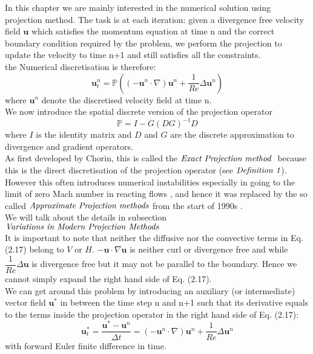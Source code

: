 In this chapter we are mainly interested in the numerical solution using projection method. The task is at each iteration: given a divergence free velocity field $\textbf{u}$ which satisfies the momentum equation at time n and the correct boundary condition required by the problem, we perform the projection to update the velocity to time n+1 and still satisfies all the constraints.\\

the Numerical discretisation is therefore:
\begin{equation}
\textbf{u}^n_t = \mathbb{P} ((-\textbf{u}^{n} \cdot \nabla) \textbf{u}^{n} + \dfrac{1}{Re} \Delta \textbf{u}^n)
\end{equation}
where $\textbf{u}^n$ denote the discretised velocity field at time n.\\
We now introduce the spatial discrete version of the projection operator
\begin{equation}
\mathbb{P} = I - G(DG)^{-1} D
\end{equation}
where $\textit{I}$ is the identity matrix and $\textit{D}$ and $\textit{G}$ are the discrete approximation to divergence and gradient operators.\\
As first developed by Chorin, this is called the $\emph{Exact Projection method }$ \cite{chorin1968numerical,almgren1996numerical,almgren2000approximate} because this is the direct discretisation of the projection operator (see $\emph{Definition 1}$). However this often introduces numerical instabilities especially in going to the limit of zero Mach number in reacting flows \cite{almgren1996numerical,almgren2000approximate,lal1993projection,minion1996projection}, and hence it was replaced by the so called $\emph{Approximate Projection methods}$ from the start of 1990s 
\cite{brown2001accurate,almgren1996numerical,almgren2000approximate}. \\
We will talk about the details in subsection $\emph{Variations in Modern Projection Methods}$\\

It is important to note that neither the diffusive nor the convective terms in Eq. (2.17) belong to $\textit{V}$ or $\textit{H}$. $-\textbf{u} \cdot \nabla \textbf{u}$ is neither curl or divergence free and while $\dfrac{1}{Re} \Delta \textbf{u}$ is divergence free but it may not be parallel to the boundary. Hence we cannot simply expand the right hand side of Eq. (2.17).\\

We can get around this problem by introducing an auxiliary (or intermediate) vector field $\textbf{u}^*$ in between the time step n and n+1 such that its derivative equals to the terms inside the projection operator in the right hand side of Eq. (2.17):\\
\begin{dmath}
\textbf{u}^*_t = \dfrac{\textbf{u}^* - \textbf{u}^n}{\Delta t} = (-\textbf{u}^{n} \cdot \nabla) \textbf{u}^{n} + \dfrac{1}{Re} \Delta \textbf{u}^n
\end{dmath}
with forward Euler finite difference in time.\\

